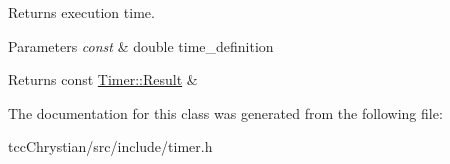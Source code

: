 Returns execution time. 


\begin{DoxyParams}{Parameters}
{\em const} & double time\-\_\-definition\\
\hline
\end{DoxyParams}
\begin{DoxyReturn}{Returns}
const \hyperlink{classTimer_1_1Result}{Timer\-::\-Result} \& 
\end{DoxyReturn}


The documentation for this class was generated from the following file\-:\begin{DoxyCompactItemize}
\item 
tcc\-Chrystian/src/include/timer.\-h\end{DoxyCompactItemize}
